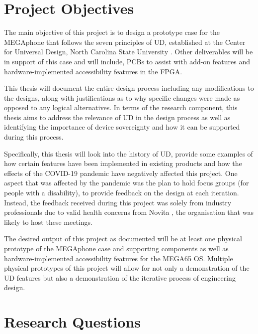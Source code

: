 \section{Project Objectives}

The main objective of this project is to design a prototype case for the MEGAphone that follows the seven principles of UD, established at the Center for Universal Design, North Carolina State University \cite{sevenprinciples}. 
Other deliverables will be in support of this case and will include, PCBs to assist with add-on features and hardware-implemented accessibility features in the FPGA.

This thesis will document the entire design process including any modifications to the designs, along with justifications as to why specific changes were made as opposed to any logical alternatives.
In terms of the research component, this thesis aims to address the relevance of UD in the design process as well as identifying the importance of device sovereignty and how it can be supported during this process.

Specifically, this thesis will look into the history of UD, provide some examples of how certain features have been implemented in existing products and how the effects of the COVID-19 pandemic have negatively affected this project.
One aspect that was affected by the pandemic was the plan to hold focus groups (for people with a disability), to provide feedback on the design at each iteration.
Instead, the feedback received during this project was solely from industry professionals due to valid health concerns from Novita \cite{novita}, the organisation that was likely to host these meetings.

The desired output of this project as documented will be at least one physical prototype of the MEGAphone case and supporting components as well as hardware-implemented accessibility features for the MEGA65 OS.
Multiple physical prototypes of this project will allow for not only a demonstration of the UD features but also a demonstration of the iterative process of engineering design.

\section{Research Questions}


